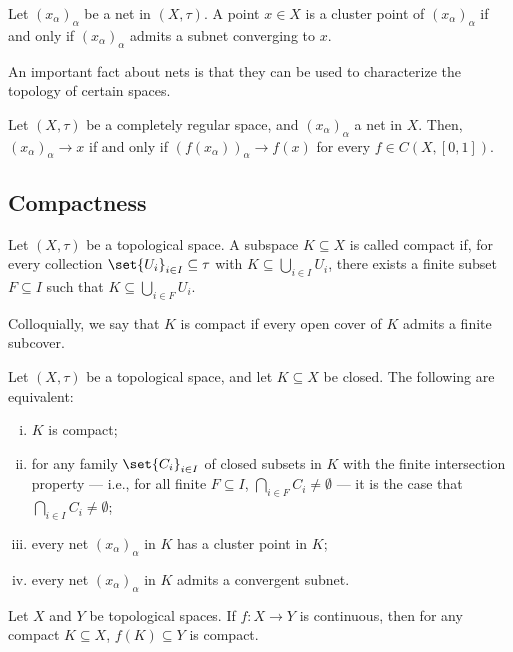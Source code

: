 \begin{fact}
  Let $\left(x_{\alpha}\right)_{\alpha}$ be a net in $\left(X,\tau\right)$. A point $x\in X$ is a cluster point of $\left(x_{\alpha}\right)_{\alpha}$ if and only if $\left(x_{\alpha}\right)_{\alpha}$ admits a subnet converging to $x$.
\end{fact}
An important fact about nets is that they can be used to characterize the topology of certain spaces.
\begin{fact}
  Let $\left(X,\tau\right)$ be a completely regular space, and $\left(x_{\alpha}\right)_{\alpha}$ a net in $X$. Then, $\left(x_{\alpha}\right)_{\alpha}\rightarrow x$ if and only if $\left(f\left(x_{\alpha}\right)\right)_{\alpha}\rightarrow f(x)$ for every $f\in C\left(X,\left[0,1\right]\right)$.
\end{fact}
\subsection{Compactness}%
\begin{definition}
  Let $\left(X,\tau\right)$ be a topological space. A subspace $K\subseteq X$ is called compact if, for every collection $\set{U_i}_{i\in I}\subseteq \tau$ with $K\subseteq \bigcup_{i\in I}U_i$, there exists a finite subset $F\subseteq I$ such that $K\subseteq \bigcup_{i\in F}U_i$.\newline

  Colloquially, we say that $K$ is compact if every open cover of $K$ admits a finite subcover.
\end{definition}
\begin{proposition}
  Let $\left(X,\tau\right)$ be a topological space, and let $K\subseteq X$ be closed. The following are equivalent:
  \begin{enumerate}[(i)]
    \item $K$ is compact;
    \item for any family $\set{C_i}_{i\in I}$ of closed subsets in $K$ with the finite intersection property --- i.e., for all finite $F\subseteq I$, $\bigcap_{i\in F}C_i \neq \emptyset$ --- it is the case that $\bigcap_{i\in I}C_i \neq \emptyset$;
    \item every net $\left(x_{\alpha}\right)_{\alpha}$ in $K$ has a cluster point in $K$;
    \item every net $\left(x_{\alpha}\right)_{\alpha}$ in $K$ admits a convergent subnet.
  \end{enumerate}
\end{proposition}
\begin{fact}
  Let $X$ and $Y$ be topological spaces. If $f\colon X\rightarrow Y$ is continuous, then for any compact $K\subseteq X$, $f(K)\subseteq Y$ is compact.
\end{fact}
